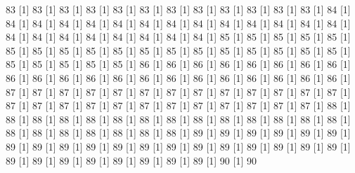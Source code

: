 \documentclass[12pt]{article}
\begin{document}
\begin{Schunk}
\begin{Soutput}
[1] 83%
[1] 83%
[1] 83%
[1] 83%
[1] 83%
[1] 83%
[1] 83%
[1] 83%
[1] 83%
[1] 83%
[1] 83%
[1] 83%
[1] 84%
[1] 84%
[1] 84%
[1] 84%
[1] 84%
[1] 84%
[1] 84%
[1] 84%
[1] 84%
[1] 84%
[1] 84%
[1] 84%
[1] 84%
[1] 84%
[1] 84%
[1] 84%
[1] 84%
[1] 84%
[1] 84%
[1] 84%
[1] 84%
[1] 84%
[1] 85%
[1] 85%
[1] 85%
[1] 85%
[1] 85%
[1] 85%
[1] 85%
[1] 85%
[1] 85%
[1] 85%
[1] 85%
[1] 85%
[1] 85%
[1] 85%
[1] 85%
[1] 85%
[1] 85%
[1] 85%
[1] 85%
[1] 85%
[1] 85%
[1] 85%
[1] 85%
[1] 86%
[1] 86%
[1] 86%
[1] 86%
[1] 86%
[1] 86%
[1] 86%
[1] 86%
[1] 86%
[1] 86%
[1] 86%
[1] 86%
[1] 86%
[1] 86%
[1] 86%
[1] 86%
[1] 86%
[1] 86%
[1] 86%
[1] 86%
[1] 86%
[1] 87%
[1] 87%
[1] 87%
[1] 87%
[1] 87%
[1] 87%
[1] 87%
[1] 87%
[1] 87%
[1] 87%
[1] 87%
[1] 87%
[1] 87%
[1] 87%
[1] 87%
[1] 87%
[1] 87%
[1] 87%
[1] 87%
[1] 87%
[1] 87%
[1] 87%
[1] 87%
[1] 87%
[1] 87%
[1] 88%
[1] 88%
[1] 88%
[1] 88%
[1] 88%
[1] 88%
[1] 88%
[1] 88%
[1] 88%
[1] 88%
[1] 88%
[1] 88%
[1] 88%
[1] 88%
[1] 88%
[1] 88%
[1] 88%
[1] 88%
[1] 88%
[1] 88%
[1] 88%
[1] 89%
[1] 89%
[1] 89%
[1] 89%
[1] 89%
[1] 89%
[1] 89%
[1] 89%
[1] 89%
[1] 89%
[1] 89%
[1] 89%
[1] 89%
[1] 89%
[1] 89%
[1] 89%
[1] 89%
[1] 89%
[1] 89%
[1] 89%
[1] 89%
[1] 89%
[1] 89%
[1] 89%
[1] 89%
[1] 89%
[1] 89%
[1] 90%
[1] 90%

\end{Soutput}
\end{Schunk}
\end{document}
